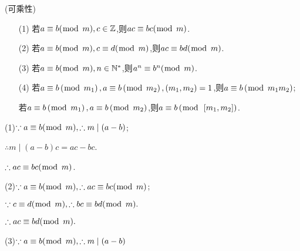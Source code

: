 \theorem (可乘性)
\begin{enumerate}[itemindent=2em]
	\item[(1)] 若$a \equiv b(\bmod \hspace{1ex}m), c \in \mathbb{Z}$,则$a c \equiv b c(\bmod \hspace{1ex}m)$.
	\item[(2)] 若$a \equiv b(\bmod \hspace{1ex}m), c \equiv d(\bmod \hspace{1ex}m)$,则$a c \equiv b d(\bmod \hspace{1ex}m)$.
	\item[(3)] 若$a \equiv b(\bmod \hspace{1ex}m), n \in \mathbb{N}^{*}$,则$a^{n} \equiv b^{n}(\bmod \hspace{1ex}m)$.
	\item[(4)] 若$a \equiv b\left(\bmod \hspace{1ex}m_{1}\right), a \equiv b\left(\bmod \hspace{1ex}m_{2}\right),\left(m_{1}, m_{2}\right)=1$,则$a \equiv b\left(\bmod \hspace{1ex}m_{1} m_{2}\right)$;
	
	若$a \equiv b\left(\bmod \hspace{1ex}m_{1}\right), a \equiv b\left(\bmod \hspace{1ex}m_{2}\right)$,则$a \equiv b\left(\bmod \hspace{1ex}\left[m_{1}, m_{2}\right]\right)$.
\end{enumerate}

\proof (1)$\because a \equiv b(\bmod \hspace{1ex}m), \therefore m \mid(a-b)$;

$\therefore m \mid(a-b) c=a c-b c$.

$\therefore a c \equiv b c(\bmod \hspace{1ex}m)$.

(2)$\because a \equiv b(\bmod \hspace{1ex}m), \therefore a c \equiv b c(\bmod \hspace{1ex}m)$;

$\because c \equiv d(\bmod \hspace{1ex}m), \therefore b c \equiv b d(\bmod \hspace{1ex}m) .$

$\therefore a c \equiv b d(\bmod \hspace{1ex}m) .$

(3)$\because a \equiv b(\bmod \hspace{1ex}m), \therefore m \mid(a-b)$

